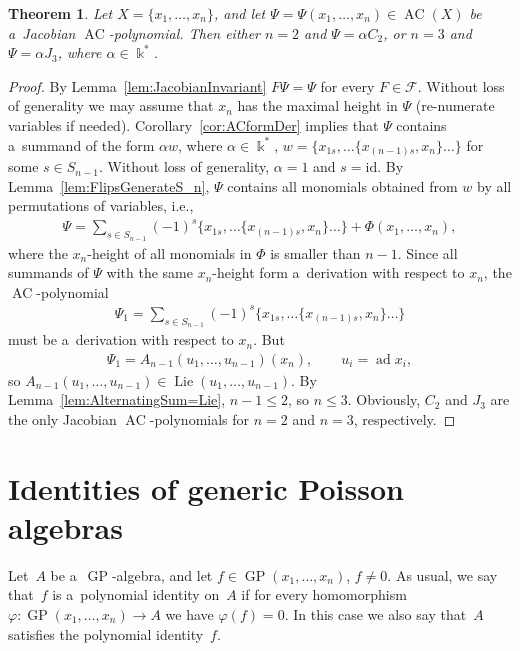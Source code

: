 \documentclass[11pt]{article}
\newtheorem{theorem}{Theorem}
\DeclareMathOperator{\ad}{ad}
\begin{document}
\begin{theorem}
Let $X=\{x_1,\dots, x_n\}$, and let $\Psi =\Psi(x_1,\dots, x_n)\in \operatorname{AC}(X)$ be a~Jacobian $\operatorname{AC}$-polynomial.
Then either $n=2$ and $\Psi = \alpha C_2$, or $n=3$ and $\Psi = \alpha J_3$, where $\alpha \in \Bbbk^*$.
\end{theorem}

\begin{proof}
By Lemma~\ref{lem:JacobianInvariant} $F\Psi = \Psi$ for every $F\in \mathcal F$.
Without loss of generality we may assume that $x_n$ has the maximal height in $\Psi $ (re-numerate variables if needed).
Corollary~\ref{cor:ACformDer} implies that $\Psi $ contains a~summand of the form $\alpha w$, where $\alpha\in\Bbbk^*$,
$w = \{x_{1s}, \dots \{x_{(n-1)s}, x_n\}\dots \}$ for some $s\in S_{n-1}$.
Without loss of generality, $\alpha =1$ and $s=\mathrm{id}$.
By Lemma~\ref{lem:FlipsGenerateS_n}, $\Psi $ contains all monomials obtained from $w $ by all permutations of variables,
i.e.,
\begin{gather*}
\Psi = \sum\limits_{s\in S_{n-1}}(-1)^s \{x_{1s}, \dots \{x_{(n-1)s}, x_n\}\dots \} + \Phi(x_1,\dots, x_n),
\end{gather*}
where the $x_n$-height of all monomials in $\Phi $ is smaller than $n-1$.
Since all summands of $\Psi $ with the same $x_n$-height form a~derivation with respect to $x_n$, the $\operatorname{AC}$-polynomial
\begin{gather*}
\Psi_1 = \sum\limits_{s\in S_{n-1}}(-1)^s \{x_{1s}, \dots \{x_{(n-1)s}, x_n\}\dots \}
\end{gather*}
must be a~derivation with respect to $x_n$.
But
\begin{gather*}
\Psi_1 = A_{n-1}(u_1,\dots, u_{n-1})(x_n),
\qquad
u_i=\ad x_i,
\end{gather*}
so $A_{n-1}(u_1,\dots, u_{n-1})\in \operatorname{Lie}(u_1,\dots, u_{n-1})$.
By Lemma~\ref{lem:AlternatingSum=Lie}, $n-1\le 2$, so $n\le 3$.
Obviously, $C_2$ and $J_3$ are the only Jacobian $\operatorname{AC}$-polynomials for $n=2$ and $n=3$, respectively.
\end{proof}


\section{Identities of generic Poisson algebras}

Let~$A$ be a~$\operatorname{GP}$-algebra, and let $f\in \operatorname{GP}(x_1,\dots, x_n)$, $f\ne 0$.
As usual, we say that~$f$ is a~polynomial identity on~$A$ if for every homomorphism $\varphi: \operatorname{GP}(x_1,\dots, x_n) \to A$
we have \mbox{$\varphi(f)=0$}.
In this case we also say that~$A$ satisf\/ies the polynomial identity~$f$.
\end{document}
